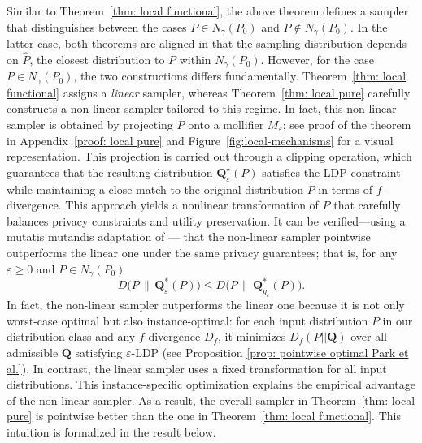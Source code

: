 \documentclass[accepted]{article}
\theoremstyle{plain} %
\theoremstyle{definition}
\theoremstyle{remark}
\newcommand{\eps}{\varepsilon}
\newcommand{\bQ}{\mathbf{Q}}
\newcommand{\ngb}{N_\gamma(P_0)}
\begin{document}
Similar to Theorem~\ref{thm: local functional}, the above theorem defines a sampler that distinguishes between the cases \( P \in N_\gamma(P_0) \) and \( P \notin N_\gamma(P_0) \). In the latter case, both theorems are aligned in that the sampling distribution depends on \( \hat{P} \), the closest distribution to \( P \) within \( N_\gamma(P_0) \). However, for the case \( P \in N_\gamma(P_0) \), the two constructions differs fundamentally. Theorem~\ref{thm: local functional} assigns a \textit{linear} sampler, whereas Theorem~\ref{thm: local pure} carefully constructs a non-linear sampler tailored to this regime. In fact, this non-linear sampler is obtained by projecting $P$ onto a mollifier $M_\eps$; see proof of the theorem in Appendix~\ref{proof: local pure} and Figure~\ref{fig:local-mechanisms} for a visual representation. This projection is carried out through a clipping operation, which guarantees that the resulting distribution $ \mathbf{Q}^\star_\varepsilon(P) $ satisfies the LDP constraint while maintaining a close match to the original distribution $ P $ in terms of $ f $-divergence. This approach yields a nonlinear transformation of $ P $ that carefully balances privacy constraints and utility preservation.
It can be verified---using a mutatis mutandis adaptation of \cite[Proposition C.5]{park2024exactly}--- that the non-linear sampler pointwise outperforms the linear one under the same privacy guarantees; that is, for any $\eps\geq 0$ and $P\in N_\gamma(P_0)$
\[
D\big(P \,\|\, \bQ^*_{\eps}(P)\big) \leq D\big(P \,\|\, \bQ^*_{g_\eps}(P)\big).
\]
In fact, the non-linear sampler outperforms the linear one because it is not only worst-case optimal but also instance-optimal: for each input distribution $P$ in our distribution class and any $f$-divergence $D_f$, it minimizes $D_f(P || \mathbf{Q})$ over all admissible $\mathbf{Q}$ satisfying $\varepsilon$-LDP (see Proposition \ref{prop: pointwise optimal Park et al.}). In contrast, the linear sampler uses a fixed transformation for all input distributions. This instance-specific optimization explains the empirical advantage of the non-linear sampler. As a result, the overall sampler in Theorem~\ref{thm: local pure} is pointwise better than the one in Theorem~\ref{thm: local functional}. This intuition is formalized in the result below. 



\end{document}
